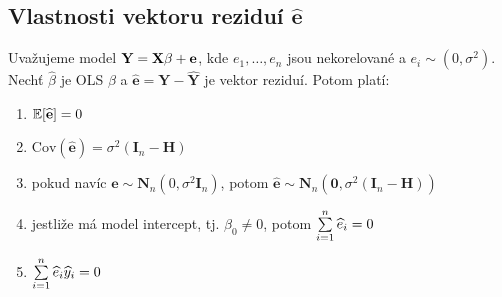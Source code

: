 \subsection{Vlastnosti vektoru reziduí $ \widehat{\textbf{e}} $}

\begin{theorem}
	Uvažujeme model $ \textbf{Y} = \textbf{X} \beta + \textbf{e} $, kde $ e_1, \dots , e_n $ jsou nekorelované a $ e_i \sim (0,\sigma^{2}) $. Nechť $ \widehat{\beta} $ je OLS $ \beta $ a $ \widehat{\textbf{e}} = \textbf{Y} - \widehat{\textbf{Y}} $ je vektor reziduí. Potom platí:
	
\begin{enumerate}
\item $ \mathbb{E} [ \widehat{\textbf{e}} ] = 0 $
\item $ \text{Cov}( \widehat{\textbf{e}} ) = \sigma^{2} ( \textbf{I}_n - \textbf{H} ) $
\item pokud navíc $ \textbf{e} \sim \textbf{N}_n ( 0, \sigma^{2} \textbf{I}_n ) $, potom $ \widehat{\textbf{e}} \sim \textbf{N}_n ( \textbf{0} , \sigma^{2} ( \textbf{I}_n - \textbf{H} ) ) $
\item jestliže má model intercept, tj. $ \beta_0 \neq 0 $, potom $ \sum\limits_{i=1}^{n} \widehat{e}_i = 0 $
\item $ \sum\limits_{i=1}^{n} \widehat{e}_i \widehat{y}_i = 0 $
\end{enumerate}		
\end{theorem}

